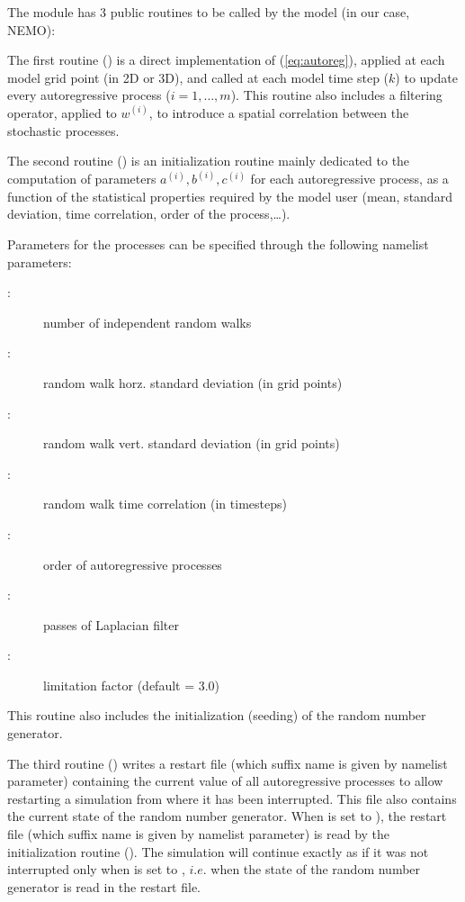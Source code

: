 \documentclass[../tex_main/NEMO_manual]{subfiles}
\begin{document}
The  module has 3 public routines to be called by the model (in our case, NEMO):

The first routine () is a direct implementation of (\autoref{eq:autoreg}),
applied at each model grid point (in 2D or 3D), and called at each model time step ($k$) to
update every autoregressive process ($i=1,\ldots,m$).
This routine also includes a filtering operator, applied to $w^{(i)}$,
to introduce a spatial correlation between the stochastic processes.

The second routine () is an initialization routine mainly dedicated to
the computation of parameters $a^{(i)}, b^{(i)}, c^{(i)}$ for each autoregressive process,
as a function of the statistical properties required by the model user
(mean, standard deviation, time correlation, order of the process,\ldots). 

Parameters for the processes can be specified through the following  namelist parameters:
\begin{description}
\item[:]   number of independent random walks
\item[:] random walk horz. standard deviation (in grid points)
\item[:]  random walk vert. standard deviation (in grid points)
\item[:]  random walk time correlation (in timesteps)
\item[:]   order of autoregressive processes
\item[:]   passes of Laplacian filter
\item[:]   limitation factor (default = 3.0)
\end{description}
This routine also includes the initialization (seeding) of the random number generator.

The third routine () writes a restart file
(which suffix name is given by  namelist parameter) containing the current value of
all autoregressive processes to allow restarting a simulation from where it has been interrupted.
This file also contains the current state of the random number generator.
When  is set to ),
the restart file (which suffix name is given by  namelist parameter) is read by
the initialization routine ().
The simulation will continue exactly as if it was not interrupted only
when  is set to ,
$i.e.$ when the state of the random number generator is read in the restart file.
\end{document}
